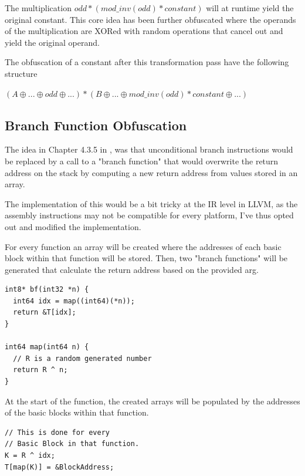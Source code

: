 The multiplication $ odd * (mod\_inv(odd) * constant)$ will at runtime yield the original constant. This core idea has been further obfuscated
where the operands of the multiplication are XORed with random operations that cancel out and yield the original operand.

The obfuscation of a constant after this transformation pass have the following structure

$(A \oplus ... \oplus odd \oplus ...) * (B \oplus ... \oplus mod\_inv(odd) * constant \oplus ...)$

\subsection{Branch Function Obfuscation}

The idea in Chapter 4.3.5 in \cite{ss-chpt4}, was that unconditional branch instructions would be replaced by a call to a
"branch function" that would overwrite the return address on the stack by computing a new return address from values stored in an array.

The implementation of this would be a bit tricky at the IR level in LLVM, as the assembly instructions may not be compatible for every platform,
I've thus opted out and modified the implementation.

For every function an array will be created where the addresses of each basic block within that function will be stored.
Then, two "branch functions" will be generated that calculate the return address based on the provided arg.

\lstset{language=C++} %
\lstset{basicstyle=\ttfamily} %
\begin{lstlisting}
int8* bf(int32 *n) {
  int64 idx = map((int64)(*n));
  return &T[idx];
}

int64 map(int64 n) {
  // R is a random generated number
  return R ^ n;
}

\end{lstlisting}

At the start of the function, the created arrays will be populated by the addresses
of the basic blocks within that function.

\lstset{language=C++} %
\lstset{basicstyle=\ttfamily} %
\begin{lstlisting}
// This is done for every
// Basic Block in that function.
K = R ^ idx;
T[map(K)] = &BlockAddress;
\end{lstlisting}

